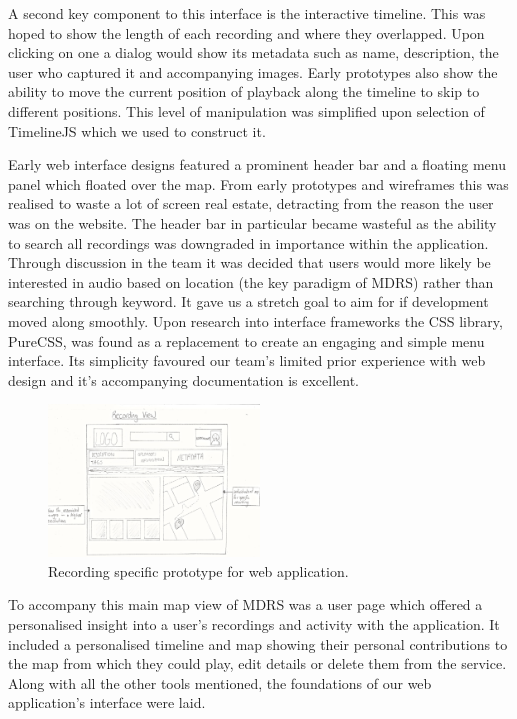\documentclass{l3proj}
\begin{document}
A second key component to this interface is the interactive timeline. This was
hoped to show the length of each recording and where they overlapped. Upon
clicking on one a dialog would show its metadata such as name, description, the
user who captured it and accompanying images. Early prototypes also show the
ability to move the current position of playback along the timeline to skip to
different positions. This level of manipulation was simplified upon selection of
TimelineJS which we used to construct it.

Early web interface designs featured a prominent header bar and a floating menu
panel which floated over the map. From early prototypes and wireframes this was
realised to waste a lot of screen real estate, detracting from the reason the
user was on the website. The header bar in particular became wasteful as the
ability to search all recordings was downgraded in importance within the
application. Through discussion in the team it was decided that users would more
likely be interested in audio based on location (the key paradigm of MDRS)
rather than searching through keyword. It gave us a stretch goal to aim for if
development moved along smoothly. Upon research into interface frameworks the
CSS library, PureCSS, was found as a replacement to create an engaging and
simple menu interface. Its simplicity favoured our team’s limited prior
experience with web design and it’s accompanying documentation is excellent.

\begin{figure}[ht!]
  \centering
\includegraphics[width=0.5\textwidth]{images/web-recording-view.jpg}
\caption{Recording specific prototype for web application.}
\end{figure}

To accompany this main map view of MDRS was a user page which offered a
personalised insight into a user’s recordings and activity with the application.
It included a personalised timeline and map showing their personal contributions
to the map from which they could play, edit details or delete them from the
service. Along with all the other tools mentioned, the foundations of our
web application’s interface were laid.
\end{document}
